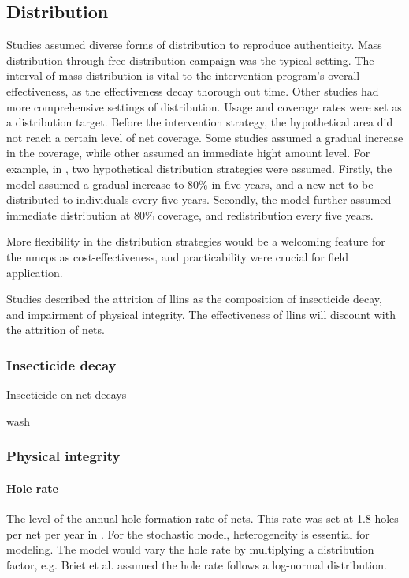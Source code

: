 \documentclass[a4paper, 12pt, twoside]{article}
\begin{document}
\subsection{Distribution}%
\label{sub:distribution}
Studies assumed diverse forms of distribution to reproduce authenticity.
Mass distribution through free distribution campaign was the typical setting.
The interval of mass distribution is vital to the intervention program's overall effectiveness, as the effectiveness decay thorough out time.
Other studies had more comprehensive settings of distribution.
Usage and coverage rates were set as a distribution target.
Before the intervention strategy, the hypothetical area did not reach a certain level of net coverage.
Some studies assumed a gradual increase in the coverage, while other assumed an immediate hight amount level.
For example, in \cite{Griffin2010}, two hypothetical distribution strategies were assumed.
Firstly, the model assumed a gradual increase to 80\% in five years, and a new net to be distributed to individuals every five years.
Secondly, the model further assumed immediate distribution at 80\% coverage, and redistribution every five years.

More flexibility in the distribution strategies would be a welcoming feature for the \gls{nmcp}s as cost-effectiveness, and practicability were crucial for field application.

\label{sub:attrition}

Studies described the attrition of \gls{llins} as the composition of insecticide decay, and impairment of physical integrity.
The effectiveness of \gls{llins} will discount with the attrition of nets.

\subsubsection{Insecticide decay}
Insecticide on net decays 

wash


\subsubsection{Physical integrity}
\paragraph{Hole rate}%
\label{par:hole_rate}
The level of the annual hole formation rate of nets.
This rate was set at 1.8 holes per net per year in \cite{Briet2013}.
For the stochastic model, heterogeneity is essential for modeling.
The model would vary the hole rate by multiplying a distribution factor, e.g. Briet et al. \cite{Briet2013} assumed the hole rate follows a log-normal distribution.
\end{document}
